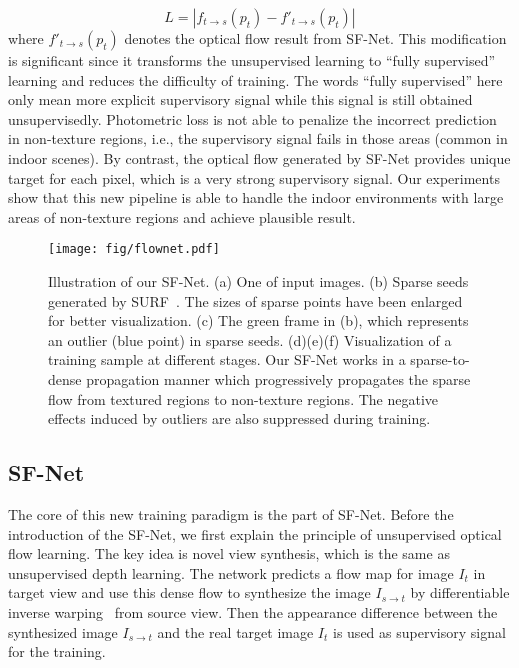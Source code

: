 \documentclass[10pt,twocolumn,letterpaper]{article}
\begin{document}
\begin{equation}
    L = |f_{t\xrightarrow{}s}(p_t) - f'_{t\xrightarrow{}s}(p_t) |
\end{equation}
where $f'_{t\xrightarrow{}s}(p_t)$ denotes the optical flow result from SF-Net. This modification is significant since it transforms the unsupervised learning to ``fully supervised'' learning and reduces the difficulty of training. The words ``fully supervised'' here only mean more explicit supervisory signal while this signal is still obtained unsupervisedly. Photometric loss is not able to penalize the incorrect prediction in non-texture regions, i.e., the supervisory signal fails in those areas (common in indoor scenes). By contrast, the optical flow generated by SF-Net provides unique target for each pixel, which is a very strong supervisory signal. Our experiments show that this new pipeline is able to handle the indoor environments with large areas of non-texture regions and achieve plausible result.

\begin{figure}
\begin{center}
  \texttt{[image: fig/flownet.pdf]}
\end{center}
   \vspace{-3mm}
   \caption{Illustration of our SF-Net. (a) One of input images. (b) Sparse seeds generated by SURF~\cite{bay2006surf}. The sizes of sparse points have been enlarged for better visualization. (c) The green frame in (b), which represents an outlier (blue point) in sparse seeds. (d)(e)(f) Visualization of a training sample at different stages. Our SF-Net works in a sparse-to-dense propagation manner which progressively propagates the sparse flow from textured regions to non-texture regions. The negative effects induced by outliers are also suppressed during training.}
\label{fig:flownet}
\vspace{-5mm}
\end{figure}

\subsection{SF-Net}

The core of this new training paradigm is the part of SF-Net. Before the introduction of the SF-Net, we first explain the principle of unsupervised optical flow learning. The key idea is novel view synthesis, which is the same as unsupervised depth learning. The network predicts a flow map for image $I_t$ in target view and use this dense flow to synthesize the image $I_{s\xrightarrow{}t}$ by differentiable inverse warping~\cite{jaderberg2015spatial} from source view. Then the appearance difference between the synthesized image $I_{s\xrightarrow{}t}$ and the real target image $I_t$ is used as supervisory signal for the training. 
\end{document}
